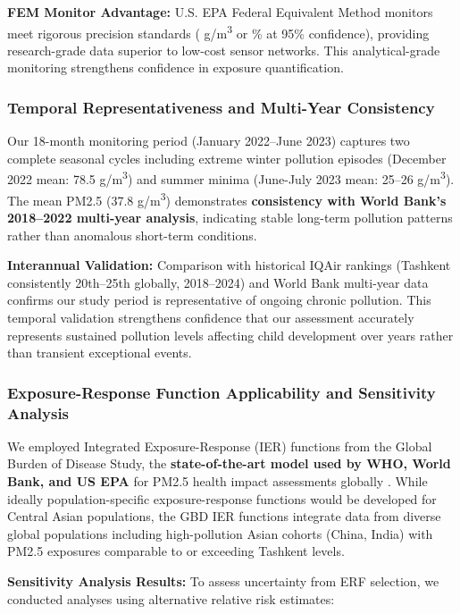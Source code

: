 \documentclass[11pt,a4paper]{article}
\begin{document}
\textbf{FEM Monitor Advantage:} U.S. EPA Federal Equivalent Method monitors meet rigorous precision standards ( \textmu g/m\textsuperscript{3} or \% at 95\% confidence), providing research-grade data superior to low-cost sensor networks. This analytical-grade monitoring strengthens confidence in exposure quantification.

\subsubsection{Temporal Representativeness and Multi-Year Consistency}

Our 18-month monitoring period (January 2022--June 2023) captures two complete seasonal cycles including extreme winter pollution episodes (December 2022 mean: 78.5 \textmu g/m\textsuperscript{3}) and summer minima (June-July 2023 mean: 25--26 \textmu g/m\textsuperscript{3}). The mean PM2.5 (37.8 \textmu g/m\textsuperscript{3}) demonstrates \textbf{consistency with World Bank's 2018--2022 multi-year analysis}, indicating stable long-term pollution patterns rather than anomalous short-term conditions.

\textbf{Interannual Validation:} Comparison with historical IQAir rankings (Tashkent consistently 20th--25th globally, 2018--2024) and World Bank multi-year data confirms our study period is representative of ongoing chronic pollution. This temporal validation strengthens confidence that our assessment accurately represents sustained pollution levels affecting child development over years rather than transient exceptional events.

\subsubsection{Exposure-Response Function Applicability and Sensitivity Analysis}

We employed Integrated Exposure-Response (IER) functions from the Global Burden of Disease Study, the \textbf{state-of-the-art model used by WHO, World Bank, and US EPA} for PM2.5 health impact assessments globally \citep{burnett2014integrated}. While ideally population-specific exposure-response functions would be developed for Central Asian populations, the GBD IER functions integrate data from diverse global populations including high-pollution Asian cohorts (China, India) with PM2.5 exposures comparable to or exceeding Tashkent levels.

\textbf{Sensitivity Analysis Results:} To assess uncertainty from ERF selection, we conducted analyses using alternative relative risk estimates:
\end{document}
